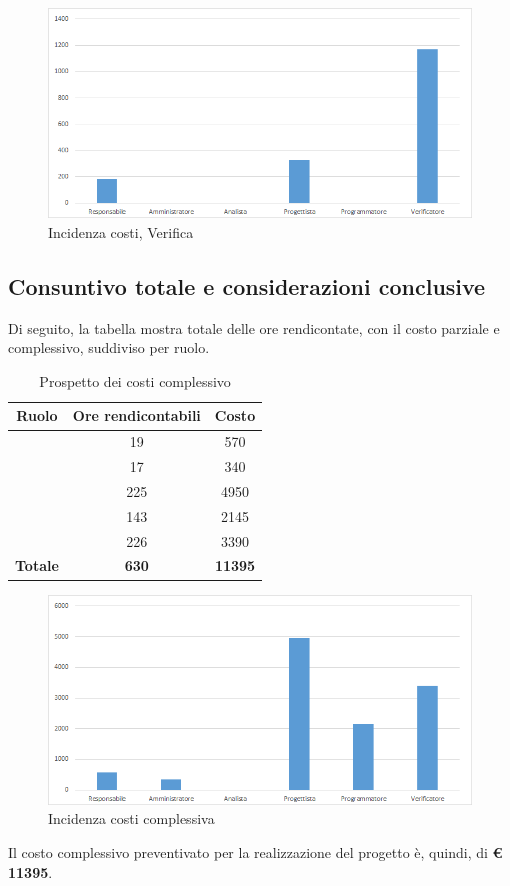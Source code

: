 \begin{figure}[H]
	\centering
	\includegraphics[scale=0.6]{img/8-5.png}
	\caption{Incidenza costi, Verifica}
\end{figure}

\newpage
\subsection{Consuntivo totale e considerazioni conclusive}

Di seguito, la tabella mostra totale delle ore rendicontate, con il costo parziale e complessivo, suddiviso per ruolo. 

\begin{table}[H]
	\begin{center}
		\begin{tabular}{|c|c|c|}
			\hline
			\textbf{Ruolo}	& \textbf{Ore rendicontabili} & \textbf{Costo} \\
			\hline
			\Res	&	19  &	570	\\
			\hline
			\Amm	&	17  &	340	\\
			\hline
			\Prog	&	225  &	4950	\\
			\hline
			\Progr	&	143  &	2145	\\
			\hline
			\Ver	&	226  &	3390	\\
			\hline
			\textbf{Totale}  & \textbf{630}  &	\textbf{11395}	\\
			\hline
		\end{tabular}
	\end{center}
	\caption{Prospetto dei costi complessivo}
\end{table}

\begin{figure}[H]
	\centering
	\includegraphics[scale=0.6]{img/8-6.png}
	\caption{Incidenza costi complessiva}
\end{figure}

Il costo complessivo preventivato per la realizzazione del progetto è, quindi, di \textbf{€ 11395}.